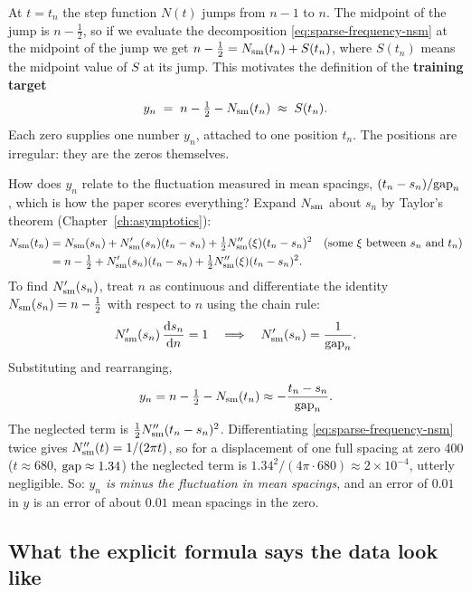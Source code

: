 At $t=t_n$ the step function $N(t)$ jumps from $n-1$ to $n$. The midpoint of the jump is $n-\tfrac12$, so if we evaluate the decomposition \eqref{eq:sparse-frequency-nsm} at the midpoint of the jump we get $n-\tfrac12=N_{\mathrm{sm}}(t_n)+S(t_n)$, where $S(t_n)$ means the midpoint value of $S$ at its jump. This motivates the definition of the \textbf{training target}
\begin{equation}
y_n \;=\; n-\tfrac12-N_{\mathrm{sm}}(t_n)\;\approx\; S(t_n).
\label{eq:sparse-frequency-target}
\end{equation}
Each zero supplies one number $y_n$, attached to one position $t_n$. The positions are irregular: they are the zeros themselves.

How does $y_n$ relate to the fluctuation measured in mean spacings, $(t_n-s_n)/\mathrm{gap}_n$, which is how the paper scores everything? Expand $N_{\mathrm{sm}}$ about $s_n$ by Taylor's theorem (Chapter~\ref{ch:asymptotics}):
\begin{align}
N_{\mathrm{sm}}(t_n)&=N_{\mathrm{sm}}(s_n)+N_{\mathrm{sm}}'(s_n)(t_n-s_n)+\tfrac12N_{\mathrm{sm}}''(\xi)(t_n-s_n)^2 \quad\text{(some $\xi$ between $s_n$ and $t_n$)}\notag\\
&=n-\tfrac12+N_{\mathrm{sm}}'(s_n)(t_n-s_n)+\tfrac12N_{\mathrm{sm}}''(\xi)(t_n-s_n)^2 .
\end{align}
To find $N_{\mathrm{sm}}'(s_n)$, treat $n$ as continuous and differentiate the identity $N_{\mathrm{sm}}(s_n)=n-\tfrac12$ with respect to $n$ using the chain rule:
\begin{equation}
N_{\mathrm{sm}}'(s_n)\,\frac{\mathrm{d} s_n}{\mathrm{d} n}=1
\quad\Longrightarrow\quad
N_{\mathrm{sm}}'(s_n)=\frac{1}{\mathrm{gap}_n}.
\label{eq:sparse-frequency-slope-gap}
\end{equation}
Substituting and rearranging,
\begin{equation}
y_n=n-\tfrac12-N_{\mathrm{sm}}(t_n)\approx-\frac{t_n-s_n}{\mathrm{gap}_n}.
\label{eq:sparse-frequency-yfluct}
\end{equation}
The neglected term is $\tfrac12N_{\mathrm{sm}}''(t_n-s_n)^2$. Differentiating \eqref{eq:sparse-frequency-nsm} twice gives $N_{\mathrm{sm}}''(t)=1/(2\pi t)$, so for a displacement of one full spacing at zero 400 ($t\approx680$, $\mathrm{gap}\approx1.34$) the neglected term is $1.34^2/(4\pi\cdot680)\approx2\times10^{-4}$, utterly negligible. So: \emph{$y_n$ is minus the fluctuation in mean spacings}, and an error of $0.01$ in $y$ is an error of about $0.01$ mean spacings in the zero.

\subsection{What the explicit formula says the data look like}

